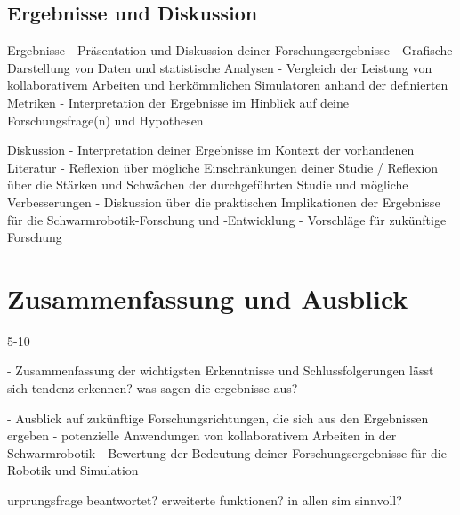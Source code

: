 \documentclass[german,version-2020-11]{uzl-thesis}
\begin{document}
        
            
            
      



    
\section{Ergebnisse und Diskussion}



Ergebnisse
      - Präsentation und Diskussion deiner Forschungsergebnisse
      - Grafische Darstellung von Daten und statistische Analysen
      - Vergleich der Leistung von kollaborativem Arbeiten und herkömmlichen Simulatoren anhand der definierten Metriken
      - Interpretation der Ergebnisse im Hinblick auf deine Forschungsfrage(n) und Hypothesen
   
Diskussion 
      - Interpretation deiner Ergebnisse im Kontext der vorhandenen Literatur 
      - Reflexion über mögliche Einschränkungen deiner Studie / Reflexion über die Stärken und Schwächen der durchgeführten Studie und mögliche Verbesserungen
      - Diskussion über die praktischen Implikationen der Ergebnisse für die Schwarmrobotik-Forschung und -Entwicklung
      - Vorschläge für zukünftige Forschung
      

\chapter{Zusammenfassung und Ausblick}


%

5-10%


   - Zusammenfassung der wichtigsten Erkenntnisse und Schlussfolgerungen
   lässt sich tendenz erkennen?
   was sagen die ergebnisse aus?


   - Ausblick auf zukünftige Forschungsrichtungen, die sich aus den Ergebnissen ergeben
   - potenzielle Anwendungen von kollaborativem Arbeiten in der Schwarmrobotik 
   - Bewertung der Bedeutung deiner Forschungsergebnisse für die Robotik und Simulation

   urprungsfrage beantwortet?
   erweiterte funktionen?
   in allen sim sinnvoll?
\end{document}
